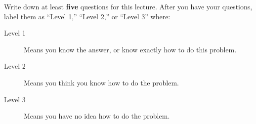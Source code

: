\begin{xarmaBoost}
  Write down at least \textbf{five} questions for this lecture. After
  you have your questions, label them as ``Level 1,'' ``Level 2,'' or
  ``Level 3'' where:
\begin{description}
\item[Level 1] Means you know the answer, or know exactly how to do
  this problem.
\item[Level 2] Means you think you know how to do the problem.
\item[Level 3] Means you have no idea how to do the problem.
\end{description}
\begin{freeResponse}
\end{freeResponse}
\end{xarmaBoost}
